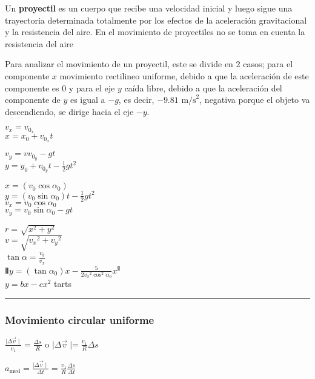 \documentclass[
]{article}
\begin{document}
Un \textbf{proyectil} es un cuerpo que recibe una velocidad inicial y
luego sigue una trayectoria determinada totalmente por los efectos de la
aceleración gravitacional y la resistencia del aire. En el movimiento de
proyectiles no se toma en cuenta la resistencia del aire

Para analizar el movimiento de un proyectil, este se divide en 2 casos;
para el componente {\(x\)} movimiento rectilineo uniforme, debido a que
la aceleración de este componente es 0 y para el eje {\(y\)} caída
libre, debido a que la aceleración del componente de {\(y\)} es igual a
{\(- g\)}, es decir, {\(- 9.81\text{~m/s}^{2}\)}, negativa porque el
objeto va descendiendo, se dirige hacia el eje {\(- y\)}.

{\(v_{x} = v_{0_{x}}\)}\\
{\(x = x_{0} + v_{0_{x}}t\)}

{\(v_{y} = vv_{0_{y}} - gt\)}\\
{\(y = y_{0} + v_{0_{y}}t - \frac{1}{2}gt^{2}\)}

{\(x = (v_{0}\cos\alpha_{0})\)}\\
{\(y = (v_{0}\sin\alpha_{0})t - \frac{1}{2}gt^{2}\)}\\
{\(v_{x} = v_{0}\cos\alpha_{0}\)}\\
{\(v_{y} = v_{0}\sin\alpha_{0} - gt\)}

{\(r = \sqrt{x^{2} + y^{2}}\)}\\
{\(v = \sqrt{{v_{x}}^{2} + {v_{y}}^{2}}\)}\\
{\(\tan\alpha = \frac{v_{y}}{v_{x}}\)}\\
{Ⅱ\(y = (\tan\alpha_{0})x - \frac{5}{2{v_{0}}^{2}\cos^{2}\alpha_{0}}x^{Ⅱ}\)}\\
{\(y = bx - cx^{2}\)} tarts

\begin{center}\rule{0.5\linewidth}{0.5pt}\end{center}

\hypertarget{movimiento-circular-uniforme}{%
\subsubsection{Movimiento circular
uniforme}\label{movimiento-circular-uniforme}}

{\(\frac{\mid \Delta\overset{\rightarrow}{v} \mid}{v_{1}} = \frac{\Delta s}{R}\)}
o
{\(\mid \Delta\overset{\rightarrow}{v}\operatorname{\mid=}\frac{v_{1}}{R}\Delta s\)}

{\(a_{\text{med}} = \frac{\mid \Delta\overset{\rightarrow}{v} \mid}{\Delta t} = \frac{v_{1}}{R}\frac{\Delta s}{\Delta t}\)}
\end{document}
